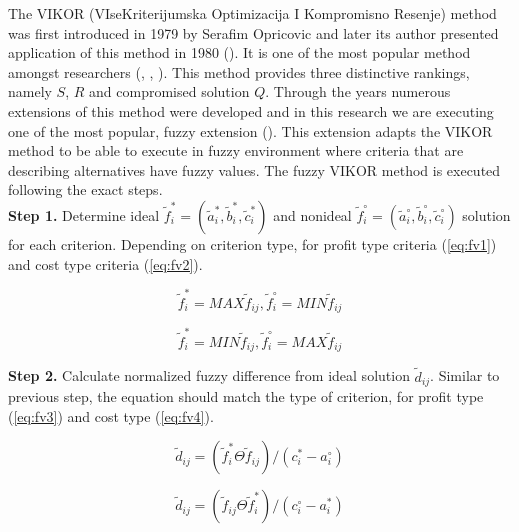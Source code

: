 The VIKOR (VIseKriterijumska Optimizacija I Kompromisno Resenje) method was first introduced in 1979 by Serafim Opricovic and later its author presented application of this method in 1980 (\cite{duckstein1980multiobjective}). It is one of the most popular method amongst researchers (\cite{rostamzadeh2015application}, \cite{opricovic2007extended}, \cite{opricovic2011fuzzy}). This method provides three distinctive rankings, namely $S$, $R$ and compromised solution $Q$. Through the years numerous extensions of this method were developed and in this research we are executing one of the most popular, fuzzy extension (\cite{opricovic2007fuzzy}). This extension adapts the VIKOR method to be able to execute in fuzzy environment where criteria that are describing alternatives have fuzzy values. The fuzzy VIKOR method is executed following the exact steps.\\

\noindent \textbf{Step 1.} Determine ideal $\tilde{f}_{i}^{*} = (\tilde{a}_{i}^{*}, \tilde{b}_{i}^{*}, \tilde{c}_{i}^{*})$ and nonideal $\tilde{f}_{i}^{\circ}  = (\tilde{a}_{i}^{\circ}, \tilde{b}_{i}^{\circ}, \tilde{c}_{i}^{\circ})$ solution for each criterion. Depending on criterion type, for profit type criteria (\ref{eq:fv1}) and cost type criteria (\ref{eq:fv2}).

\begin{equation}
    \tilde{f}_{i}^{*}=M A X \tilde{f}_{i j}, \tilde{f}_{i}^{\circ}=M I N \tilde{f}_{i j}
    \label{eq:fv1}
\end{equation}

\begin{equation}
    \tilde{f}_{i}^{*}=M I N \tilde{f}_{i j}, \tilde{f}_{i}^{\circ}=M A X \tilde{f}_{i j}
    \label{eq:fv2}
\end{equation}

\noindent \textbf{Step 2.} Calculate normalized fuzzy difference from ideal solution $\tilde{d}_{i j}$. Similar to previous step, the equation should match the type of criterion, for profit type (\ref{eq:fv3}) and cost type (\ref{eq:fv4}).

\begin{equation}
    \tilde{d}_{i j}=\left(\tilde{f}_{i}^{*} \Theta \tilde{f}_{i j}\right) /\left(c_{i}^{*}-a_{i}^{\circ}\right)
    \label{eq:fv3}
\end{equation}

\begin{equation}
     \tilde{d}_{i j}=\left(\tilde{f}_{i j} \Theta \tilde{f}_{i}^{*}\right) /\left(c_{i}^{\circ}-a_{i}^{*}\right)
     \label{eq:fv4}
\end{equation}

